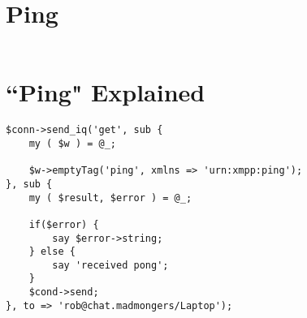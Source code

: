 \section{Ping}

\pause

\begin{shaded}
\inputminted{perl}{examples/ping.pl}
\end{shaded}

\newpage

\section{``Ping" Explained}

\pause

\begin{shaded}
\begin{verbatim}
$conn->send_iq('get', sub {
    my ( $w ) = @_;

    $w->emptyTag('ping', xmlns => 'urn:xmpp:ping');
}, sub {
    my ( $result, $error ) = @_;

    if($error) {
        say $error->string;
    } else {
        say 'received pong';
    }
    $cond->send;
}, to => 'rob@chat.madmongers/Laptop');
\end{verbatim}
\end{shaded}
